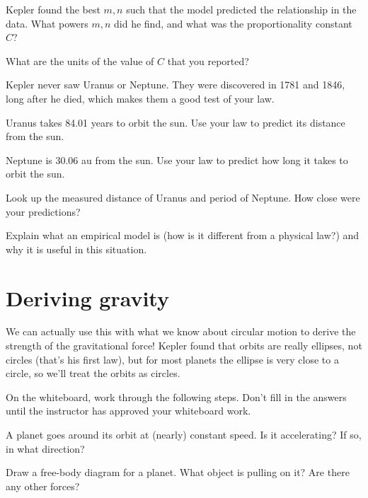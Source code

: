 \documentclass{handout}
\begin{document}
\begin{questions}
    \question Kepler found the best $m,n$ such that the model predicted the relationship in the data. What powers $m,n$ did he find, and what was the proportionality constant $C$?

    \answerspace{1in}
    \answerspace{\fill}
\end{questions}
\begin{questions}
    \question What are the units of the value of $C$ that you reported?

    \answerspace{1in}
    \answerspace{\fill}
\end{questions}

\clearpage
Kepler never saw Uranus or Neptune. They were discovered in 1781 and 1846, long after he died, which makes them a good test of your law.

\begin{questions}
    \question Uranus takes 84.01 years to orbit the sun. Use your law to predict its distance from the sun.

    \answerspace{1.5in}

    \question Neptune is 30.06 au from the sun. Use your law to predict how long it takes to orbit the sun.

    \answerspace{1.5in}

    \question Look up the measured distance of Uranus and period of Neptune. How close were your predictions?

    \answerspace{1in}
    
    \question Explain what an empirical model is (how is it different from a physical law?) and why it is useful in this situation.
    \answerspace{1in}
\end{questions}

\clearpage
\section{Deriving gravity}
We can actually use this with what we know about circular motion to derive the strength of the gravitational force! Kepler found that orbits are really ellipses, not circles (that's his first law), but for most planets the ellipse is very close to a circle, so we'll treat the orbits as circles.

On the whiteboard, work through the following steps. Don't fill in the answers until the instructor has approved your whiteboard work.
\begin{questions}
    \question A planet goes around its orbit at (nearly) constant speed. Is it accelerating? If so, in what direction?

    \answerspace{1in}

    \question Draw a free-body diagram for a planet. What object is pulling on it? Are there any other forces?

    \answerspace{1.5in}
\end{questions}
\end{document}
